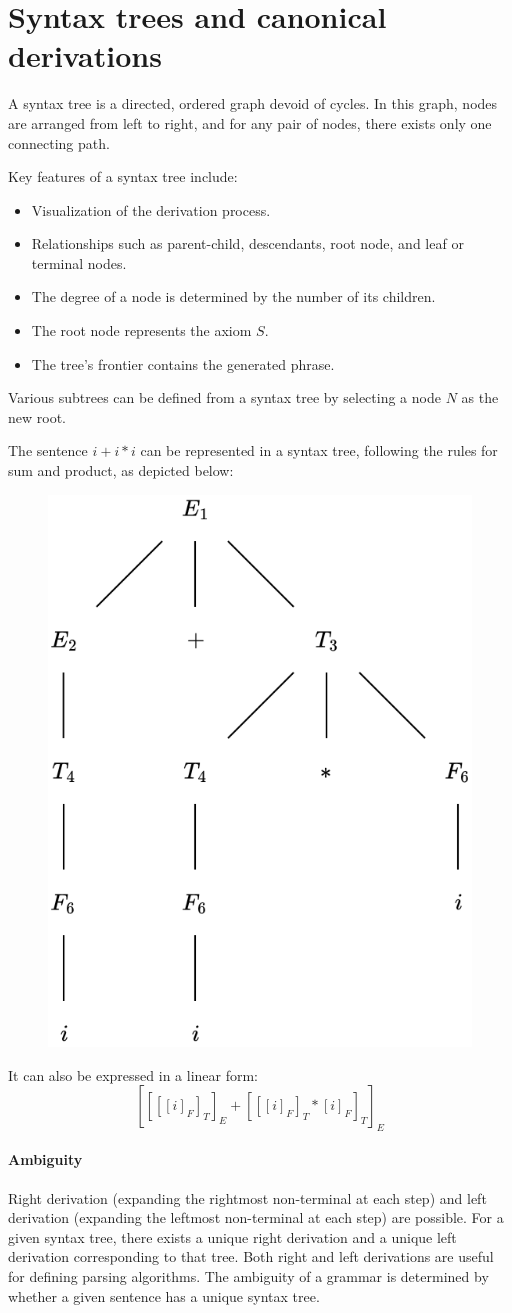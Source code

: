 \section{Syntax trees and canonical derivations}

\begin{definition}
    A syntax tree is a directed, ordered graph devoid of cycles.
    In this graph, nodes are arranged from left to right, and for any pair of nodes, there exists only one connecting path.
\end{definition}
Key features of a syntax tree include:
\begin{itemize}
    \item Visualization of the derivation process.
    \item Relationships such as parent-child, descendants, root node, and leaf or terminal nodes.
    \item The degree of a node is determined by the number of its children.
    \item The root node represents the axiom $S$.
    \item The tree's frontier contains the generated phrase.
\end{itemize}
Various subtrees can be defined from a syntax tree by selecting a node $N$ as the new root.
\begin{example}
    The sentence $i+i*i$ can be represented in a syntax tree, following the rules for sum and product, as depicted below:
    \begin{figure}[H]
        \centering
        \includegraphics[width=0.25\linewidth]{images/syntree.png}
    \end{figure}
    It can also be expressed in a linear form:
    \[[[[[i]_F]_T]_E+[[[i]_F]_T*[i]_F]_T]_E\]
\end{example}

\paragraph*{Ambiguity}
Right derivation (expanding the rightmost non-terminal at each step) and left derivation (expanding the leftmost non-terminal at each step) are possible.
For a given syntax tree, there exists a unique right derivation and a unique left derivation corresponding to that tree.
Both right and left derivations are useful for defining parsing algorithms.
The ambiguity of a grammar is determined by whether a given sentence has a unique syntax tree.

